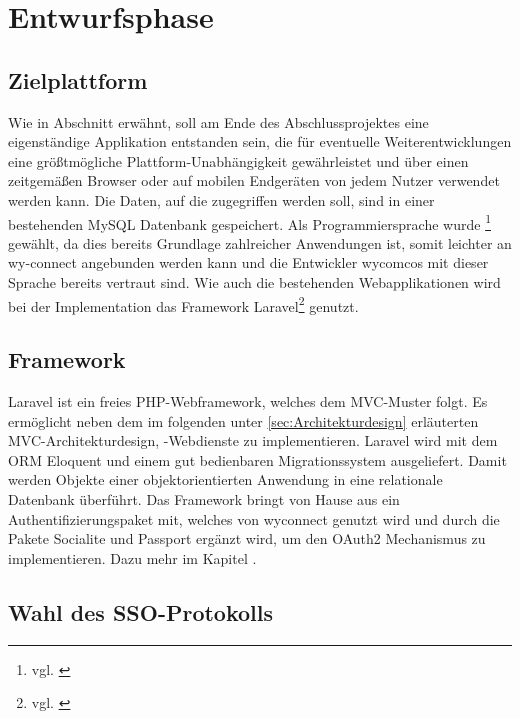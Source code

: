 \section{Entwurfsphase} 
\label{sec:Entwurfsphase}

\subsection{Zielplattform}
\label{sec:Zielplattform}

Wie in Abschnitt  erwähnt, soll am Ende des Abschlussprojektes eine eigenständige Applikation entstanden sein, die für eventuelle Weiterentwicklungen eine größtmögliche Plattform-Unabhängigkeit gewährleistet und über einen zeitgemäßen Browser oder auf mobilen Endgeräten von jedem Nutzer verwendet werden kann. 
Die Daten, auf die zugegriffen werden soll, sind in einer bestehenden MySQL Datenbank gespeichert. 
Als Programmiersprache wurde \footnote{vgl. \cite{PHP}} gewählt, da dies bereits Grundlage zahlreicher Anwendungen ist, somit leichter an wy-connect angebunden werden kann und die Entwickler wycomcos mit dieser Sprache bereits vertraut sind. 
Wie auch die bestehenden Webapplikationen wird bei der Implementation das Framework Laravel\footnote{vgl. \cite{Laravel}} genutzt.

\subsection{Framework}
\label{sec:Framework}

Laravel ist ein freies \ac{PHP}-Webframework, welches dem \ac{MVC}-Muster folgt. Es ermöglicht neben dem im folgenden unter \ref{sec:Architekturdesign} erläuterten \ac{MVC}-Architekturdesign, -Webdienste zu implementieren. Laravel wird mit dem \ac{ORM} Eloquent und einem gut bedienbaren Migrationssystem ausgeliefert. Damit werden Objekte einer objektorientierten Anwendung in eine relationale Datenbank überführt.
Das Framework bringt von Hause aus ein Authentifizierungspaket mit, welches von wyconnect genutzt wird und durch die Pakete Socialite und Passport ergänzt wird, um den OAuth2 Mechanismus zu implementieren. Dazu mehr im Kapitel .

\subsection{Wahl des SSO-Protokolls}
\label{sec:Protokollwahl}

